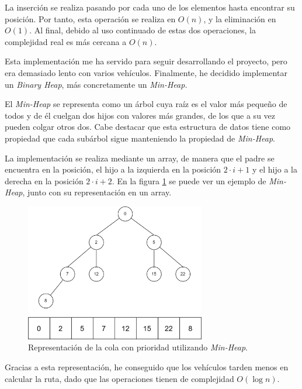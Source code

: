 La inserción se realiza pasando por cada uno de los elementos hasta encontrar su posición. Por tanto, esta operación se realiza en $O(n)$, y la eliminación en $O(1)$. Al final, debido al uso continuado de estas dos operaciones, la complejidad real es más cercana a $O(n)$.

\bigskip

Esta implementación me ha servido para seguir desarrollando el proyecto, pero era demasiado lento con varios vehículos. Finalmente, he decidido implementar un \textit{Binary Heap}, más concretamente un \textit{Min-Heap.}

\bigskip

El \textit{Min-Heap} se representa como un árbol cuya raíz es el valor más pequeño de todos y de él cuelgan dos hijos con valores más grandes, de los que a su vez pueden colgar otros dos. Cabe destacar que esta estructura de datos tiene como propiedad que cada subárbol sigue manteniendo la propiedad de \textit{Min-Heap}. 

\bigskip

La implementación se realiza mediante un array, de manera que el padre se encuentra en la posición, el hijo a la izquierda en la posición $2 \cdot i + 1$ y el hijo a la derecha en la posición $2 \cdot i + 2$. En la figura \ref{fig:minheaparray} se puede ver un ejemplo de \textit{Min-Heap}, junto con su representación en un array.

\begin{figure}[H]
    \centering
    \includegraphics[width=0.7\textwidth]{imagenes/minheap.png}
    \caption{Representación de la cola con prioridad utilizando \textit{Min-Heap}.}
    \label{fig:minheaparray}
\end{figure}

Gracias a esta representación, he conseguido que los vehículos tarden menos en calcular la ruta, dado que las operaciones tienen de complejidad $O(\log n)$.

